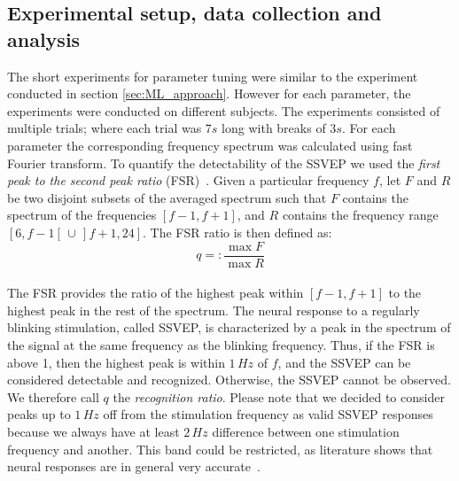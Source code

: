 \documentclass[smallextended]{svjour3}
\begin{document}
\subsection{Experimental setup, data collection and analysis}
The short experiments for parameter tuning were similar to the experiment conducted in section \ref{sec:ML_approach}. However for each parameter, the experiments were conducted on different subjects. The experiments consisted of multiple trials; where each trial was 7$s$ long with breaks of 3$s$. For each parameter the corresponding frequency spectrum was calculated using fast Fourier transform. 
To quantify the detectability of the SSVEP we used the \textit{first peak to the second peak ratio} (FSR)~\cite{Zheng2010}. 
Given a particular frequency $f$, let $F$ and $R$ be two disjoint subsets of the averaged spectrum such that $F$ contains the spectrum of the frequencies $[f-1, f+1]$, and $R$ contains the frequency range $[6, f-1[ \,\cup\, ]f+1, 24]$. The FSR ratio is then defined as:
\begin{equation}
\label{recog_rat}
q =:\frac{\max F}{\max R}
\end{equation}
\\
The FSR provides the ratio of the highest peak within $[f-1, f+1]$ to the highest peak in the rest of the spectrum. The neural response to a regularly blinking stimulation, called SSVEP, is characterized by a peak in the spectrum of the signal at the same frequency as the blinking frequency. Thus, if the FSR is above 1, then the highest peak is within $1\,\mathit{Hz}$ of $f$, and the SSVEP can be considered detectable and recognized. 
Otherwise, the SSVEP cannot be observed. 
We therefore call $q$ the \textit{recognition ratio}.
Please note that we decided to consider peaks up to $1\,\mathit{Hz}$ off from the stimulation frequency as valid SSVEP responses because we always have at least $2\,\mathit{Hz}$ difference between one stimulation frequency and another. This band could be restricted, as literature shows that neural responses are in general very accurate~\cite{SSVEPfiability}.
\end{document}
